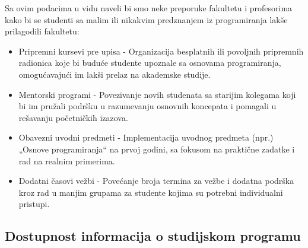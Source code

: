 \documentclass[a4paper]{article}
\begin{document}
\captionsetup[table]{skip=10pt}
\begin{table}[H]
\centering %
\caption{Predznanje iz programiranja}
\end{table}


Sa ovim podacima u vidu naveli bi smo neke preporuke fakultetu i profesorima kako bi se studenti sa malim ili nikakvim predznanjem iz programiranja lakše prilagodili fakultetu:\\

\begin{itemize}
    \item Pripremni kursevi pre upisa - Organizacija besplatnih ili povoljnih pripremnih radionica koje bi buduće studente upoznale sa osnovama programiranja, omogućavajući im lakši prelaz na akademske studije.
    \item Mentorski programi - Povezivanje novih studenata sa starijim kolegama koji bi im pružali podršku u razumevanju osnovnih koncepata i pomagali u rešavanju početničkih izazova.
    \item Obavezni uvodni predmeti - Implementacija uvodnog predmeta (npr.) „Osnove programiranja“ na prvoj godini, sa fokusom na praktične zadatke i rad na realnim primerima.
    \item Dodatni časovi vežbi - Povećanje broja termina za vežbe i dodatna podrška kroz rad u manjim grupama za studente kojima su potrebni individualni pristupi.\\
\end{itemize}


\subsection{\textbf{Dostupnost informacija o studijskom programu} }
\label{subsec:podnaslovN}
\end{document}
